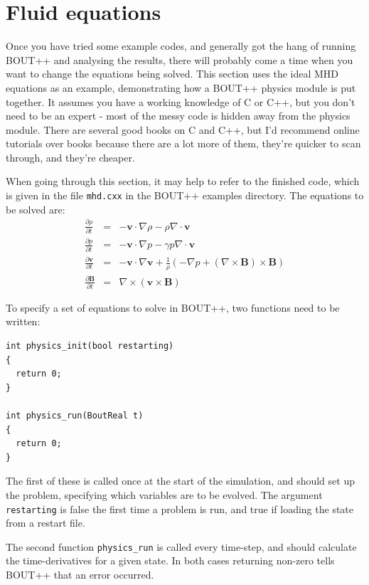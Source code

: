 \documentclass[12pt]{article}
\newcommand{\code}[1]{\texttt{#1}}
\newcommand{\deriv}[2]{\ensuremath{\frac{\partial #1}{\partial #2}}}
\begin{document}
\section{Fluid equations}
\label{sec:equations}

Once you have tried some example codes, and generally got the hang of running
BOUT++ and analysing the results, there will probably come a time when
you want to change the equations being solved. 
This section uses the ideal MHD equations as an example, demonstrating how
a BOUT++ physics module is put together. It assumes you have a working knowledge
of C or C++, but you don't need to be an expert - most of the messy code is hidden away
from the physics module. There are several good books on C and C++, but I'd recommend online
tutorials over books because there are a lot more of them, they're quicker to scan through,
and they're cheaper.

When going through this section, it may help to refer to the finished code, which
is given in the file \texttt{mhd.cxx} in the BOUT++ examples directory. The equations to be solved are:
\begin{eqnarray*}
\deriv{\rho}{t} &=& -\mathbf{v}\cdot\nabla\rho - \rho\nabla\cdot\mathbf{v} \\
\deriv{p}{t} &=& -\mathbf{v}\cdot\nabla p - \gamma p\nabla\cdot\mathbf{v} \\
\deriv{\mathbf{v}}{t} &=& -\mathbf{v}\cdot\nabla\mathbf{v} + \frac{1}{\rho}\left(-\nabla p + \left(\nabla\times\mathbf{B}\right)\times\mathbf{B}\right) \\
\deriv{\mathbf{B}}{t} &=& \nabla\times\left(\mathbf{v}\times\mathbf{B}\right)
\end{eqnarray*}

To specify a set of equations to solve in BOUT++, two functions need to be written:
\begin{lstlisting}
int physics_init(bool restarting)
{
  return 0;
}

int physics_run(BoutReal t)
{
  return 0;
}
\end{lstlisting}
The first of these is called once at the start of the simulation, and should set up the problem,
specifying which variables are to be evolved. The argument \code{restarting} is false the first time a problem is run, and true if loading the state from a
restart file.

The second function \code{physics\_run} is called every time-step,
and should calculate the time-derivatives for a given state. In both cases returning non-zero
tells BOUT++ that an error occurred.
\end{document}
